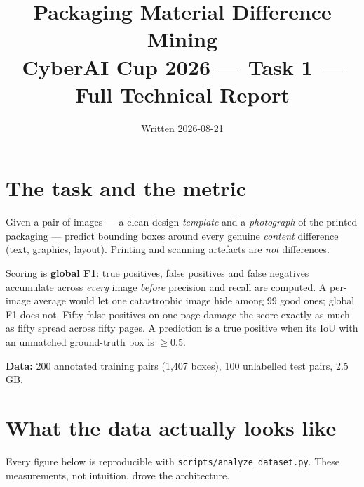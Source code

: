 \documentclass[11pt,a4paper]{article}
\title{\textbf{Packaging Material Difference Mining}\\[2mm]
\large CyberAI Cup 2026 --- Task 1 --- Full Technical Report}
\author{}
\date{Written 2026-08-21}
\begin{document}
\maketitle
\vspace{-4em}

\begin{center}
\end{center}

\section{The task and the metric}

Given a pair of images --- a clean design \emph{template} and a \emph{photograph} of the printed
packaging --- predict bounding boxes around every genuine \emph{content} difference (text,
graphics, layout). Printing and scanning artefacts are \emph{not} differences.

Scoring is \textbf{global F1}: true positives, false positives and false negatives accumulate
across \emph{every} image \emph{before} precision and recall are computed. A per-image average
would let one catastrophic image hide among 99 good ones; global F1 does not. Fifty false
positives on one page damage the score exactly as much as fifty spread across fifty pages. A
prediction is a true positive when its IoU with an unmatched ground-truth box is $\geq 0.5$.

\textbf{Data:} 200 annotated training pairs (1{,}407 boxes), 100 unlabelled test pairs, 2.5\,GB.

\section{What the data actually looks like}

Every figure below is reproducible with \texttt{scripts/analyze\_dataset.py}. These measurements,
not intuition, drove the architecture.
\end{document}

